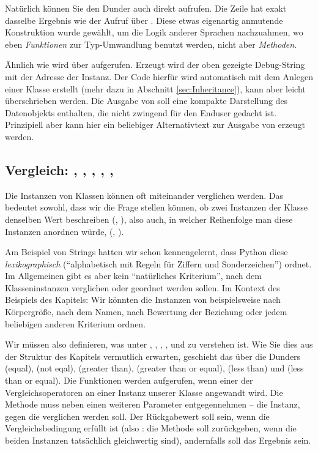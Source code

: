 Natürlich können Sie den Dunder auch direkt aufrufen. Die Zeile  hat exakt dasselbe Ergebnis wie der Aufruf über . Diese etwas eigenartig anmutende Konstruktion wurde gewählt, um die Logik anderer Sprachen nachzuahmen, wo eben \emph{Funktionen} zur Typ-Umwandlung benutzt werden, nicht aber \emph{Methoden}.

Ähnlich wie  wird  über  aufgerufen. Erzeugt wird der oben gezeigte Debug-String mit der Adresse der Instanz. Der Code hierfür wird automatisch mit dem Anlegen einer Klasse erstellt (mehr dazu in Abschnitt \ref{sec:Inheritance}), kann aber leicht überschrieben werden. Die Ausgabe von  soll eine kompakte Darstellung des Datenobjekts enthalten, die nicht zwingend für den Enduser gedacht ist. Prinzipiell aber kann hier ein beliebiger Alternativtext zur Ausgabe von  erzeugt werden.

\subsection{Vergleich: , , , , , }
Die Instanzen von Klassen können oft miteinander verglichen werden. Das bedeutet sowohl, dass wir die Frage stellen können, ob zwei Instanzen der Klasse denselben Wert beschreiben (, \eg {}), also auch, in welcher Reihenfolge man diese Instanzen anordnen würde, (, \eg {}).

Am Beispiel von Strings hatten wir schon kennengelernt, dass Python diese \emph{lexikographisch} (\enquote{alphabetisch mit Regeln für Ziffern und Sonderzeichen}) ordnet. Im Allgemeinen gibt es aber kein \enquote{natürliches Kriterium}, nach dem Klasseninstanzen verglichen oder geordnet werden sollen. Im Kontext des Beispiels des Kapitels: Wir könnten die Instanzen von  beispielsweise nach Körpergröße, nach dem Namen, nach Bewertung der Beziehung oder jedem beliebigen anderen Kriterium ordnen.

Wir müssen also definieren, was unter , , , ,  und  zu verstehen ist. Wie Sie dies aus der Struktur des Kapitels vermutlich erwarten, geschieht das über die Dunders  (equal),  (not eqal),  (greater than),  (greater than or equal),  (less than) und  (less than or equal). Die Funktionen werden aufgerufen, wenn einer der Vergleichsoperatoren an einer Instanz unserer Klasse angewandt wird. Die Methode muss neben  einen weiteren Parameter entgegennehmen -- die Instanz, gegen die verglichen werden  soll. Der Rückgabewert soll  sein, wenn die Vergleichsbedingung erfüllt ist (also \eg: die Methode  soll  zurückgeben, wenn die beiden Instanzen tatsächlich gleichwertig sind), andernfalls soll das Ergebnis  sein.

